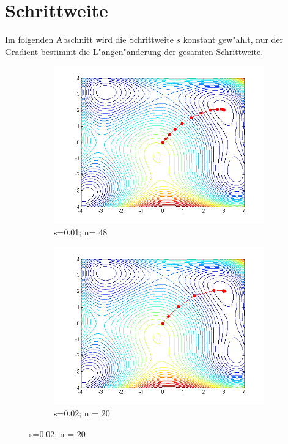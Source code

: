 \section{Schrittweite}
Im folgenden Abschnitt wird die Schrittweite $s$ konstant gew"ahlt, nur
der Gradient bestimmt die L"angen"anderung der gesamten Schrittweite.


\begin{figure}[h]
\centering
\begin{subfigure}[b]{0.49\textwidth}
\centering
\includegraphics[width=\textwidth]{descent/HB_1.png}
\caption{s=0.01; n= 48}\label{schrittweite_a}
\end{subfigure} \begin{subfigure}[b]{0.49\textwidth}
\centering
\includegraphics[width=\textwidth]{descent/HB_2.png}
\caption{s=0.02; n = 20}\label{schrittweite_b}
\end{subfigure}


\end{figure}
